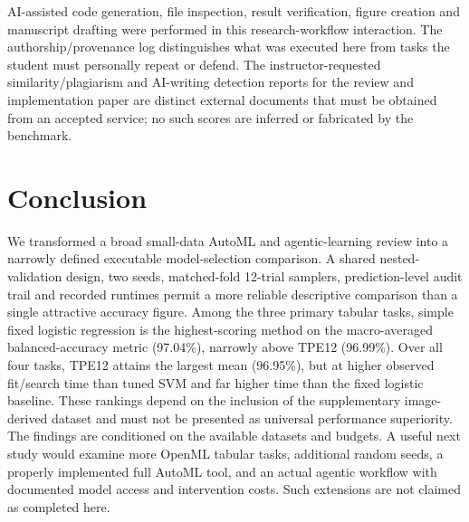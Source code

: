 \documentclass[11pt,a4paper]{article}
\begin{document}
AI-assisted code generation, file inspection, result verification, figure creation and manuscript drafting were performed in this research-workflow interaction. The authorship/provenance log distinguishes what was executed here from tasks the student must personally repeat or defend. The instructor-requested similarity/plagiarism and AI-writing detection reports for the review and implementation paper are distinct external documents that must be obtained from an accepted service; no such scores are inferred or fabricated by the benchmark.

\section{Conclusion}
We transformed a broad small-data AutoML and agentic-learning review into a narrowly defined executable model-selection comparison. A shared nested-validation design, two seeds, matched-fold 12-trial samplers, prediction-level audit trail and recorded runtimes permit a more reliable descriptive comparison than a single attractive accuracy figure. Among the three primary tabular tasks, simple fixed logistic regression is the highest-scoring method on the macro-averaged balanced-accuracy metric (97.04\%), narrowly above TPE12 (96.99\%). Over all four tasks, TPE12 attains the largest mean (96.95\%), but at higher observed fit/search time than tuned SVM and far higher time than the fixed logistic baseline. These rankings depend on the inclusion of the supplementary image-derived dataset and must not be presented as universal performance superiority. The findings are conditioned on the available datasets and budgets. A useful next study would examine more OpenML tabular tasks, additional random seeds, a properly implemented full AutoML tool, and an actual agentic workflow with documented model access and intervention costs. Such extensions are not claimed as completed here.
\end{document}
